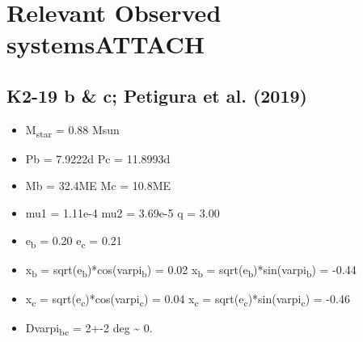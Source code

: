 \documentclass[11pt]{article}
\begin{document}
\section{Relevant Observed systems\hfill{}\textsc{ATTACH}}
\label{sec:orge5634db}
\subsection{K2-19 b \& c; Petigura et al. (2019)}
\label{sec:org64ea1f1}
\begin{itemize}
\item M\textsubscript{star} = 0.88 Msun
\item Pb = 7.9222d Pc = 11.8993d
\item Mb = 32.4ME Mc = 10.8ME
\item mu1 = 1.11e-4 mu2 = 3.69e-5 q = 3.00
\item e\textsubscript{b} = 0.20 e\textsubscript{c} = 0.21
\item x\textsubscript{b} = sqrt(e\textsubscript{b})*cos(varpi\textsubscript{b}) = 0.02
x\textsubscript{b} = sqrt(e\textsubscript{b})*sin(varpi\textsubscript{b}) = -0.44
\item x\textsubscript{c} = sqrt(e\textsubscript{c})*cos(varpi\textsubscript{c}) = 0.04
x\textsubscript{c} = sqrt(e\textsubscript{c})*sin(varpi\textsubscript{c}) = -0.46
\item Dvarpi\textsubscript{bc} = 2+-2 deg \textasciitilde{} 0.
\end{itemize}
\end{document}
